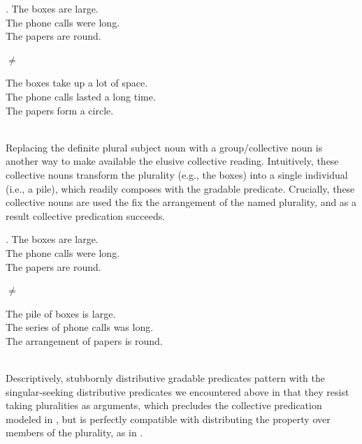 \documentclass[linguex]{sp}
\begin{document}
\begin{minipage}{.405\textwidth}
	\ex.
	The boxes are large.\\
	The phone calls were long.\\
	The papers are round.
	
\end{minipage}
\begin{minipage}{.05\textwidth}
	$\neq$
\end{minipage}
\begin{minipage}{.5\textwidth}
	The boxes take up a lot of space.\\
	The phone calls lasted a long time.\\
	The papers form a circle.
\end{minipage}\\[5pt]

Replacing the definite plural subject noun with a group/collective noun \citep[i.e., an atomizer;][]{scontras2014diss} is another way to make available the elusive collective reading. Intuitively, these collective nouns transform the plurality (e.g., the boxes) into a single individual (i.e., a pile), which readily composes with the gradable predicate. Crucially, these collective nouns are used the fix the arrangement of the named plurality, and as a result collective predication succeeds.\\

\begin{minipage}{.405\textwidth}
	\ex.
	The boxes are large.\\
	The phone calls were long.\\
	The papers are round.
	
\end{minipage}
\begin{minipage}{.05\textwidth}
	$\neq$
\end{minipage}
\begin{minipage}{.5\textwidth}
	The pile of boxes is large.\\
	The series of phone calls was long.\\
	The arrangement of papers is round.
\end{minipage}\\[5pt]

Descriptively, stubbornly distributive gradable predicates pattern with the singular-seeking distributive predicates we encountered above in that they resist taking pluralities as arguments, which precludes the collective predication modeled in \Next[a], but is perfectly compatible with distributing the property over members of the plurality, as in \Next[b].
\end{document}
